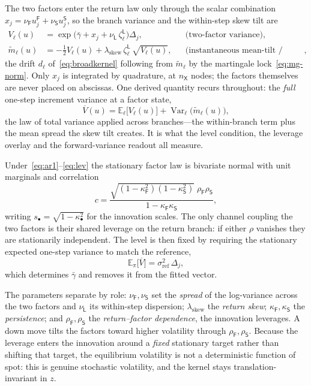 \documentclass[11pt]{article}
\newcommand{\E}{\mathbb{E}}
\newcommand{\Var}{\operatorname{Var}}
\providecommand{\1}{\mathbf 1}
\begin{document}
The two factors enter the return law only through the scalar combination
$x_j=\nu_{\mathsf F}u^{\mathsf F}_j+\nu_{\mathsf S}u^{\mathsf S}_j$, so the branch variance and the
within-step skew tilt are
\begin{align}
V_{\ell}(u)&=\exp\!\big(\bar\gamma+x_j+\nu_{\mathsf{L}}\,\zeta^{\mathsf{L}}_\ell\big)\Delta_j,
  &&\text{(two-factor variance)},\label{eq:Vell}\\
\widetilde m_{\ell}(u)&=-\tfrac12 V_{\ell}(u)
  +\lambda_{\mathrm{skew}}\,\zeta^{\mathsf{L}}_\ell\,\sqrt{V_{\ell}(u)},
  &&\text{(instantaneous mean-tilt / skew)},
\end{align}
the drift $d_\ell$ of~\eqref{eq:broadkernel} following from $\widetilde m_\ell$ by the martingale
lock~\eqref{eq:mg-norm}. Only $x_j$ is integrated by quadrature, at $n_{\mathsf X}$ nodes; the
factors themselves are never placed on abscissas. One derived quantity recurs throughout: the
\emph{full} one-step increment variance at a factor state,
\begin{equation}
  \overline V(u)=\E_\ell\bigl[V_\ell(u)\bigr]+\Var_\ell\bigl(\widetilde m_\ell(u)\bigr),
\label{eq:Vbar}
\end{equation}
the law of total variance applied across branches---the within-branch term plus the mean spread the
skew tilt creates. It is what the level condition, the leverage overlay and the forward-variance
readout all measure.

Under~\eqref{eq:ar1}--\eqref{eq:lev} the stationary factor law is bivariate normal with unit
marginals and correlation
\begin{equation}
c=\frac{\sqrt{(1-\kappa_{\mathsf F}^{2})(1-\kappa_{\mathsf S}^{2})}\;
        \rho_{\mathsf F}\rho_{\mathsf S}}{1-\kappa_{\mathsf F}\kappa_{\mathsf S}},
\label{eq:statcorr}
\end{equation}
writing $s_\bullet=\sqrt{1-\kappa_\bullet^{2}}$ for the innovation scales. The only channel
coupling the two factors is their shared leverage on the return branch: if either $\rho$ vanishes
they are stationarily independent. The level is then fixed by requiring the
stationary expected one-step variance to match the reference,
\begin{equation}
\E_\pi\bigl[\overline V\bigr]=\sigma_{\mathrm{ref}}^{2}\,\Delta_j ,
\label{eq:gbar}
\end{equation}
which determines $\bar\gamma$ and removes it from the fitted vector.

The parameters separate by role: $\nu_{\mathsf F},\nu_{\mathsf S}$ set the \emph{spread} of the
log-variance across the two factors and $\nu_{\mathsf L}$ its within-step dispersion;
$\lambda_{\mathrm{skew}}$ the \emph{return skew}; $\kappa_{\mathsf F},\kappa_{\mathsf S}$ the
\emph{persistence}; and $\rho_{\mathsf F},\rho_{\mathsf S}$ the \emph{return--factor dependence},
the innovation leverages. A down move tilts the factors toward higher volatility through
$\rho_{\mathsf F},\rho_{\mathsf S}$. Because the leverage enters the innovation around a
\emph{fixed} stationary target rather than shifting that target, the equilibrium volatility is not
a deterministic function of spot: this is genuine stochastic volatility, and the kernel stays
translation-invariant in $z$.
\end{document}
